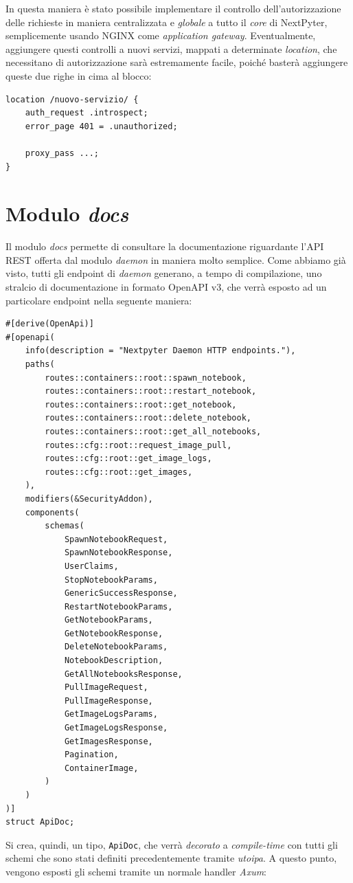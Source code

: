 In questa maniera è stato possibile implementare il controllo dell'autorizzazione delle richieste in maniera centralizzata e \textit{globale} a tutto il \textit{core} di NextPyter, semplicemente usando NGINX come \textit{application gateway}. Eventualmente, aggiungere questi controlli a nuovi servizi, mappati a determinate \textit{location}, che necessitano di autorizzazione sarà estremamente facile, poiché basterà aggiungere queste due righe in cima al blocco:
\begin{verbatim}
location /nuovo-servizio/ {
    auth_request .introspect;
    error_page 401 = .unauthorized;

    proxy_pass ...;
}
\end{verbatim}
\newpage
\section{Modulo \textit{docs}}
Il modulo \textit{docs} permette di consultare la documentazione riguardante l'API REST offerta dal modulo \textit{daemon} in maniera molto semplice. Come abbiamo già visto, tutti gli endpoint di \textit{daemon} generano, a tempo di compilazione, uno stralcio di documentazione in formato OpenAPI v3, che verrà esposto ad un particolare endpoint nella seguente maniera:
\begin{verbatim}
#[derive(OpenApi)]
#[openapi(
    info(description = "Nextpyter Daemon HTTP endpoints."),
    paths(
        routes::containers::root::spawn_notebook,
        routes::containers::root::restart_notebook,
        routes::containers::root::get_notebook,
        routes::containers::root::delete_notebook,
        routes::containers::root::get_all_notebooks,
        routes::cfg::root::request_image_pull,
        routes::cfg::root::get_image_logs,
        routes::cfg::root::get_images,
    ), 
    modifiers(&SecurityAddon),
    components(
        schemas(
            SpawnNotebookRequest,
            SpawnNotebookResponse, 
            UserClaims,
            StopNotebookParams,
            GenericSuccessResponse,
            RestartNotebookParams,
            GetNotebookParams,
            GetNotebookResponse,
            DeleteNotebookParams,
            NotebookDescription,
            GetAllNotebooksResponse,
            PullImageRequest,
            PullImageResponse,
            GetImageLogsParams,
            GetImageLogsResponse,
            GetImagesResponse,
            Pagination,
            ContainerImage,
        )
    )
)]
struct ApiDoc;
\end{verbatim}
Si crea, quindi, un tipo, \verb|ApiDoc|, che verrà \textit{decorato} a \textit{compile-time} con tutti gli schemi che sono stati definiti precedentemente tramite \textit{utoipa}. A questo punto, vengono esposti gli schemi tramite un normale handler \textit{Axum}:
